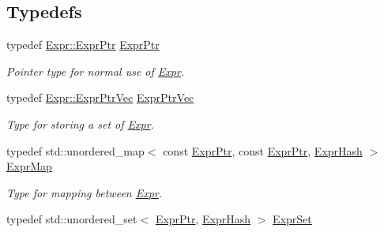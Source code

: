 \subsection*{Typedefs}
\begin{DoxyCompactItemize}
\item 
\mbox{\label{namespaceilang_a7c4196c72e53ea4df4b7861af7bc3bce}} 
typedef \mbox{\hyperlink{classilang_1_1_expr_a85952b6a34620c4c8cab6bac9c9fdf8c}{Expr\+::\+Expr\+Ptr}} \mbox{\hyperlink{namespaceilang_a7c4196c72e53ea4df4b7861af7bc3bce}{Expr\+Ptr}}
\begin{DoxyCompactList}\small\item\em Pointer type for normal use of \mbox{\hyperlink{classilang_1_1_expr}{Expr}}. \end{DoxyCompactList}\item 
\mbox{\label{namespaceilang_a95d222bcc4d46261cbf6dbc18a3f5e11}} 
typedef \mbox{\hyperlink{classilang_1_1_expr_a17efc8282f647681d37cd4c78928aa01}{Expr\+::\+Expr\+Ptr\+Vec}} \mbox{\hyperlink{namespaceilang_a95d222bcc4d46261cbf6dbc18a3f5e11}{Expr\+Ptr\+Vec}}
\begin{DoxyCompactList}\small\item\em Type for storing a set of \mbox{\hyperlink{classilang_1_1_expr}{Expr}}. \end{DoxyCompactList}\item 
\mbox{\label{namespaceilang_ad40e6475e04844bcad9c380aac0b215c}} 
typedef std\+::unordered\+\_\+map$<$ const \mbox{\hyperlink{namespaceilang_a7c4196c72e53ea4df4b7861af7bc3bce}{Expr\+Ptr}}, const \mbox{\hyperlink{namespaceilang_a7c4196c72e53ea4df4b7861af7bc3bce}{Expr\+Ptr}}, \mbox{\hyperlink{classilang_1_1_expr_hash}{Expr\+Hash}} $>$ \mbox{\hyperlink{namespaceilang_ad40e6475e04844bcad9c380aac0b215c}{Expr\+Map}}
\begin{DoxyCompactList}\small\item\em Type for mapping between \mbox{\hyperlink{classilang_1_1_expr}{Expr}}. \end{DoxyCompactList}\item 
\mbox{\label{namespaceilang_a54732171848dbcb975458e689024a04c}} 
typedef std\+::unordered\+\_\+set$<$ \mbox{\hyperlink{namespaceilang_a7c4196c72e53ea4df4b7861af7bc3bce}{Expr\+Ptr}}, \mbox{\hyperlink{classilang_1_1_expr_hash}{Expr\+Hash}} $>$ \mbox{\hyperlink{namespaceilang_a54732171848dbcb975458e689024a04c}{Expr\+Set}}

\end{DoxyCompactItemize}
